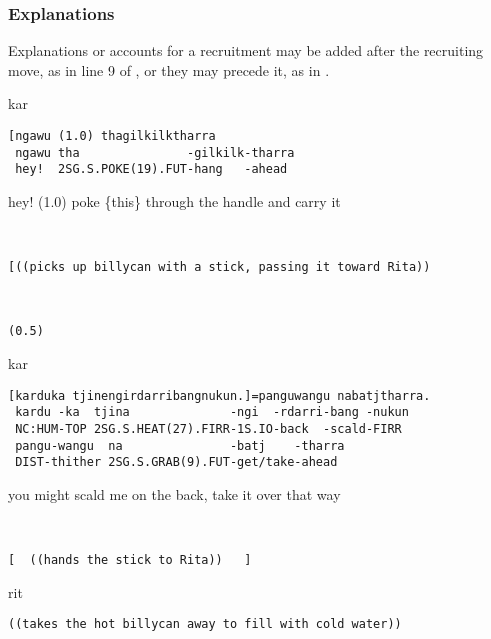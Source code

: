 \documentclass[output=paper,nonflat,colorlinks,citecolor=brown]{langsci/langscibook}
\begin{document}
\subsubsection{Explanations}

Explanations or accounts for a recruitment may be added after the recruiting move, as in line 9 of , or they may precede it, as in .

\vspace{2mm}
%
\begin{transbox}{1}{kar}
\begin{verbatim}
[ngawu (1.0) thagilkilktharra
 ngawu tha               -gilkilk-tharra
 hey!  2SG.S.POKE(19).FUT-hang   -ahead
\end{verbatim}
\hspace{0.07cm} hey! (1.0) poke \{this\} through the handle and carry it
\end{transbox}
%
\begin{transbox}{2}{~}
\begin{verbatim}
[((picks up billycan with a stick, passing it toward Rita))
\end{verbatim}
\end{transbox}
%
\begin{transbox}{3}{~}
\begin{verbatim}
(0.5)
\end{verbatim}
\end{transbox}
%
\begin{transbox}{4}{kar}
\begin{verbatim}
[karduka tjinengirdarribangnukun.]=panguwangu nabatjtharra.
 kardu -ka  tjina              -ngi  -rdarri-bang -nukun
 NC:HUM-TOP 2SG.S.HEAT(27).FIRR-1S.IO-back  -scald-FIRR
 pangu-wangu  na               -batj    -tharra
 DIST-thither 2SG.S.GRAB(9).FUT-get/take-ahead
\end{verbatim}
\hspace{0.07cm} you might scald me on the back, take it over that way
\end{transbox}
%
\begin{transbox}{5}{~}
\begin{verbatim}
[  ((hands the stick to Rita))   ]
\end{verbatim}
\end{transbox}\vspace{-2mm}
%
\begin{transbox}{6}{rit}
\begin{verbatim}
((takes the hot billycan away to fill with cold water))
\end{verbatim}
\end{transbox}\\
\end{document}
